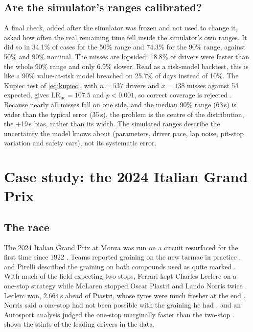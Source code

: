 \documentclass[12pt]{article}
\begin{document}
\subsection{Are the simulator's ranges calibrated?}\label{sec:calib}

A final check, added after the simulator was frozen and not used to change it, asked how often
the real remaining time fell inside the simulator's own ranges. It did so in 34.1\% of cases for the 50\% range and
74.3\% for the 90\% range, against 50\% and 90\% nominal. The misses are lopsided: 18.8\% of drivers were faster than the
whole 90\% range and only 6.9\% slower. Read as a risk-model backtest, this is like a 90\% value-at-risk model breached
on 25.7\% of days instead of 10\%. The Kupiec test of \cref{eq:kupiec}, with $n=537$ drivers and $x=138$ misses against 54 expected, gives
$\text{LR}_{\text{uc}}=107.5$ and $p<0.001$, so correct coverage is rejected \parencite{kupiec1995,christoffersen1998}. Because nearly all misses
fall on one side, and the median 90\% range (63\,s) is wider than the typical error (35\,s), the problem is the centre
of the distribution, the +19\,s bias, rather than its width. The simulated ranges describe the uncertainty the model
knows about (parameters, driver pace, lap noise, pit-stop variation and safety cars), not its systematic error.

\section{Case study: the 2024 Italian Grand Prix}\label{sec:case}

\subsection{The race}
The 2024 Italian Grand Prix at Monza was run on a circuit resurfaced for the first time since 1922
\parencite{ferrari_monza}. Teams reported graining on the new tarmac in practice \parencite{f1_monza_friday}, and Pirelli
described the graining on both compounds used as quite marked \parencite{pirelli_monza_graining}. With much of the field
expecting two stops, Ferrari kept Charles Leclerc on a one-stop strategy while McLaren stopped Oscar Piastri and Lando
Norris twice \parencite{f1_monza_race,fia_monza}. Leclerc won, 2.664\,s ahead of Piastri, whose tyres were much fresher
at the end \parencite{autosport_monza}. Norris said a one-stop had not been possible with the graining he had
\parencite{aap_monza}, and an Autosport analysis judged the one-stop marginally faster than the two-stop
\parencite{autosport_monza_analysis}.  shows the stints of the leading drivers in the data.
\end{document}

